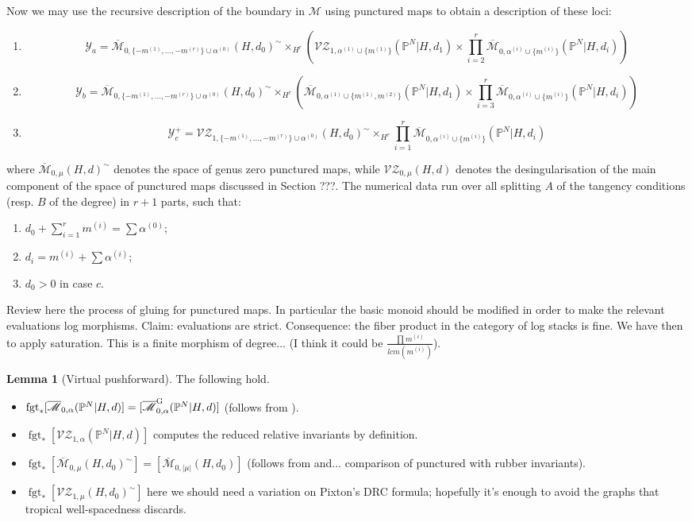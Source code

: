 \documentclass[11pt]{amsart}
\newcommand{\M}[4]{\overline{\mathcal{M}}_{#1,#2}(#3,#4)}
\newcommand{\MG}[4]{\overline{\mathcal{M}}^{\rm G}_{#1,#2}(#3,#4)}
\newcommand{\PP}{\mathbb P}
\newcommand{\VZc}[4]{\mathcal{V\!Z}_{#1,#2}(#3,#4)}
\newcommand{\fgt}{\operatorname{fgt}}
\newcommand{\Mcal}{\mathcal{M}}
\theoremstyle{definition}
\newtheorem{lemma}[thm]{Lemma}
\theoremstyle{definition}
\begin{document}
\newpage
Now we may use the recursive description of the boundary in $\Mcal$ using punctured maps \cite{PuncturedMaps} to obtain a description of these loci:
\begin{enumerate}[label=(\Alph*)]
 \item \[\mathcal Y_a=\M{0}{\{-m^{(1)},\ldots,-m^{(r)}\}\cup\alpha^{(0)}}{H}{d_0}^\sim\times_{H^r}\left(\VZc{1}{\alpha^{(1)}\cup\{m^{(1)}\}}{\PP^N|H}{d_1}\times\prod_{i=2}^r\M{0}{\alpha^{(i)}\cup\{m^{(i)}\}}{\PP^N|H}{d_i}\right)\]
 \item \[\mathcal Y_b=\M{0}{\{-m^{(1)},\ldots,-m^{(r)}\}\cup\alpha^{(0)}}{H}{d_0}^\sim\times_{H^r}\left(\M{0}{\alpha^{(1)}\cup\{m^{(1)},m^{(2)}\}}{\PP^N|H}{d_1}\times\prod_{i=3}^r\M{0}{\alpha^{(i)}\cup\{m^{(i)}\}}{\PP^N|H}{d_i}\right)\]
 \item \[\mathcal Y_c^+= \VZc{1}{\{-m^{(1)},\ldots,-m^{(r)}\}\cup\alpha^{(0)}}{H}{d_0}^{\sim} \times_{H^r}\prod_{i=1}^r\M{0}{\alpha^{(i)}\cup\{m^{(i)}\}}{\PP^N|H}{d_i}\]
\end{enumerate}
where $\M{0}{\mu}{H}{d}^\sim$ denotes the space of genus zero punctured maps, while $\VZc{0}{\mu}{H}{d}$ denotes the desingularisation of the main component of the space of punctured maps discussed in Section ???. The numerical data run over all splitting $A$ of the tangency conditions (resp. $B$ of the degree) in $r+1$ parts, such that:
\begin{enumerate}
 \item $d_0+\sum_{i=1}^r m^{(i)}=\sum\alpha^{(0)}$;
 \item $d_i=m^{(i)}+\sum\alpha^{(i)}$;
 \item $d_0>0$ in case $c$.
\end{enumerate}

Review here the process of gluing for punctured maps. In particular the basic monoid should be modified in order to make the relevant evaluations log morphisms. Claim: evaluations are strict. Consequence: the fiber product in the category of log stacks is fine. We have then to apply saturation. This is a finite morphism of degree... (I think it could be $\frac{\prod m^{(i)}}{lcm(m^{(i)})}$).

\begin{lemma}[Virtual pushforward] The following hold.
 \begin{itemize}
  \item $\fgt_*[\M{0}{\alpha}{\PP^N|H}{d}]=[\MG{0}{\alpha}{\PP^N|H}{d}]$ (follows from \cite{GathmannThesis,AbramovichMarcusWiseComparison}).
  \item $\fgt_*[\VZc{1}{\alpha}{\PP^N|H}{d}]$ computes the reduced relative invariants by definition.
  \item $\fgt_*[\M{0}{\mu}{H}{d_0}^\sim]=[\M{0}{\lvert\mu\rvert}{H}{d_0}]$ (follows from \cite{GathmannThesis} and... comparison of punctured with rubber invariants).
  \item $\fgt_*[\VZc{1}{\mu}{H}{d_0}^\sim]$ here we should need a variation on Pixton's DRC formula; hopefully it's enough to avoid the graphs that tropical well-spacedness discards.
 \end{itemize}
\end{lemma}
\end{document}
